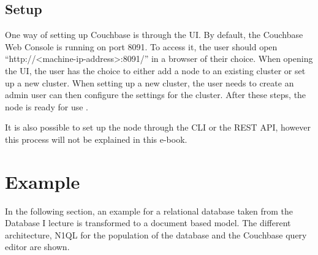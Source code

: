 \subsection{Setup}
One way of setting up Couchbase is through the \ac{UI}. By default, the Couchbase Web Console is running on port 8091. To access it, the user should open ``http://<machine-ip-address>:8091/'' in a browser of their choice. When opening the \ac{UI}, the user has the choice to either add a node to an existing cluster or set up a new cluster. When setting up a new cluster, the user needs to create an admin user can then configure the settings for the cluster. After these steps, the node is ready for use \parencite{Couchbase.20230401}.

It is also possible to set up the node through the \ac{CLI} or the \ac{REST} \ac{API}, however this process will not be explained in this e-book. 


\section{Example}
In the following section, an example for a relational database taken from the Database I lecture is transformed to a document based model. The different architecture, \ac{N1QL} for the population of the database and the Couchbase query editor are shown.

